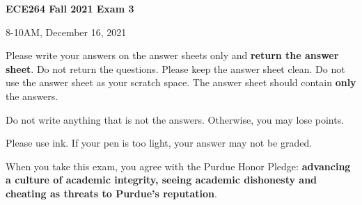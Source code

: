
\newif\ifexam
\examtrue
\examfalse






\begin{center}
\begin{huge}
{\bf
ECE264 Fall 2021
Exam 3\vspace{0.4in}

8-10AM, December 16, 2021
}

\vspace{1in}
\end{huge}

\begin{LARGE}
Please write your answers on the answer sheets only and {\bf return
the answer sheet}. Do not return the questions.  Please keep the
answer sheet clean. Do not use the answer sheet as your scratch space.
The answer sheet should contain {\bf only} the answers.
\vspace{1in}

Do not write
anything that is not the answers.  Otherwise, you may lose points.

\vspace{0.5in}

Please use  ink. If your pen is too light,
your answer may not be graded.

\end{LARGE}
\vspace{0.5in}

\begin{large}
When you take this exam, you agree with the Purdue Honor Pledge: {\bf
advancing a culture of academic integrity, seeing academic dishonesty
and cheating as threats to Purdue’s reputation}.
\end{large}

\end{center}

\clearpage


